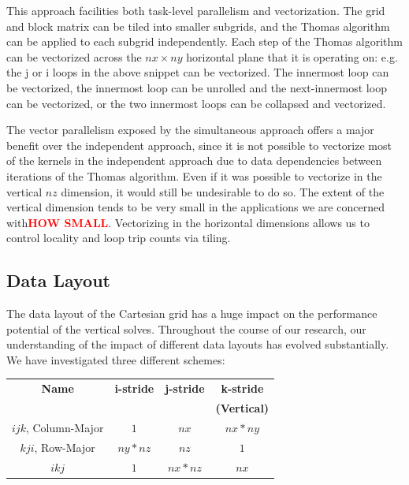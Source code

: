 \documentclass[conference]{IEEEtran}
\newcommand{\fix}[1]{{\bf \textcolor {red}{#1}}}
\begin{document}
This approach facilities both task-level parallelism and vectorization. The
grid and block matrix can be tiled into smaller subgrids, and the Thomas
algorithm can be applied to each subgrid independently. Each step of the Thomas
algorithm can be vectorized across the $nx \times ny$ horizontal plane that it
is operating on: e.g. the j or i loops in the above snippet can be vectorized.
The innermost loop can be vectorized, the innermost loop can be unrolled and
the next-innermost loop can be vectorized, or the two innermost loops can be
collapsed and vectorized.



The vector parallelism exposed by the simultaneous approach offers a major
benefit over the independent approach, since it is not possible to vectorize
most of the kernels in the independent approach due to data dependencies
between iterations of the Thomas algorithm. Even if it was possible to
vectorize in the vertical $nz$ dimension, it would still be undesirable to do
so. The extent of the vertical dimension tends to be very small in the
applications we are concerned with\fix{HOW SMALL}. Vectorizing in the
horizontal dimensions allows us to control locality and loop trip counts via
tiling.

\subsection{Data Layout}

The data layout of the Cartesian grid has a huge impact on the performance
potential of the vertical solves. Throughout the course of our research, our
understanding of the impact of different data layouts has evolved
substantially. We have investigated three different schemes:

\begin{tabular}[t]{c|c|c|c} \hline
\textbf{Name}         & \textbf{i-stride} & \textbf{j-stride} & \textbf{k-stride}   \\
                      &                   &                   & \textbf{(Vertical)} \\ \hline
\(ijk\), Column-Major & \(1\)             & \(nx\)            & \(nx * ny\)         \\ 
\(kji\), Row-Major    & \(ny * nz\)       & \(nz\)            & \(1\)               \\ 
\(ikj\)               & \(1\)             & \(nx * nz\)       & \(nx\)              
\end{tabular}
\end{document}
